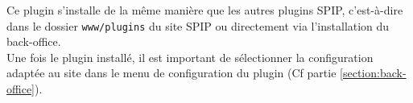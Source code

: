 Ce plugin s'installe de la même manière que les autres plugins SPIP, c’est-à-dire dans le dossier \texttt{www/plugins} du site SPIP ou directement via l'installation du back-office.\\
\newline
Une fois le plugin installé, il est important de sélectionner la configuration adaptée au site dans le menu de configuration du plugin (Cf partie \ref{section:back-office}).
